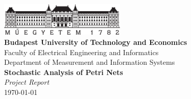\thispagestyle{empty}
\begin{center}
  \includegraphics[width=60mm,keepaspectratio]{bme_logo}\\
  \vspace{0.3cm}
  \textbf{Budapest University of Technology and Economics}\\
  \textmd{Faculty of Electrical Engineering and Informatics}\\
  \textmd{Department of Measurement and Information Systems}\\[5cm]
  \vspace{0.4cm}
  {\Huge \sffamily \bfseries Stochastic Analysis of Petri Nets}\\[0.8cm]
  \vspace{0.5cm}
  \textit{\Large Project Report}\\[4cm]
  \vfill
  {\large \today}
\end{center}

